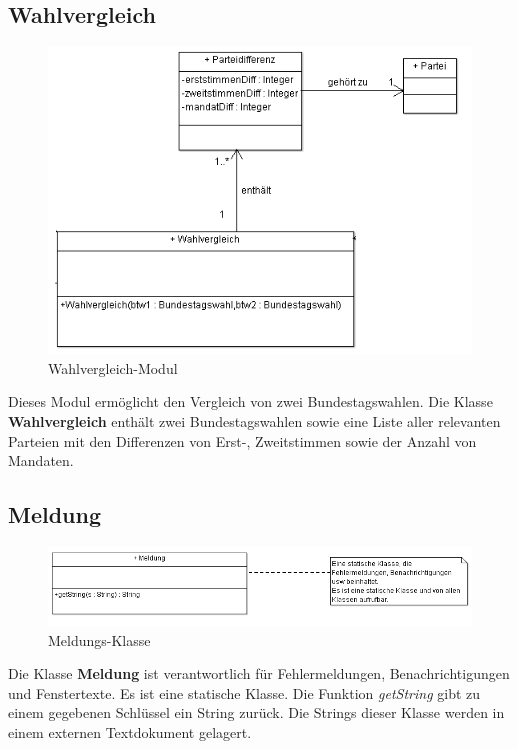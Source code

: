 \documentclass[12pt,a4paper,titlepage]{article}
\newcommand{\myma}{\fontfamily{pcr}\selectfont \textbf}
\newcommand{\mymo}{\fontfamily{pcr}\selectfont \textit}
\begin{document}
\subsection{Wahlvergleich}
\begin{figure}[!ht]
\centering
\includegraphics[scale=0.8]{Klassendiagramme/Wahlvergleich.png} \caption{Wahlvergleich-Modul} 
\end{figure}

Dieses Modul ermöglicht den Vergleich von zwei Bundestagswahlen.
Die Klasse \\ {\myma{Wahlvergleich}} enthält zwei Bundestagswahlen sowie eine Liste aller relevanten Parteien mit den Differenzen von Erst-, Zweitstimmen sowie der Anzahl von Mandaten.

\newpage
\subsection{Meldung}
\begin{figure}[!ht]
\centering
\includegraphics[scale=0.8]{Meldung_Ausschnitt.png} \caption{Meldungs-Klasse} 
\end{figure}
Die Klasse {\myma{Meldung}} ist verantwortlich für Fehlermeldungen, Benachrichtigungen und Fenstertexte. Es ist eine statische Klasse. Die Funktion {\mymo{getString}} gibt zu einem gegebenen Schlüssel ein String zurück. Die Strings dieser Klasse werden in einem externen Textdokument gelagert.
\end{document}
